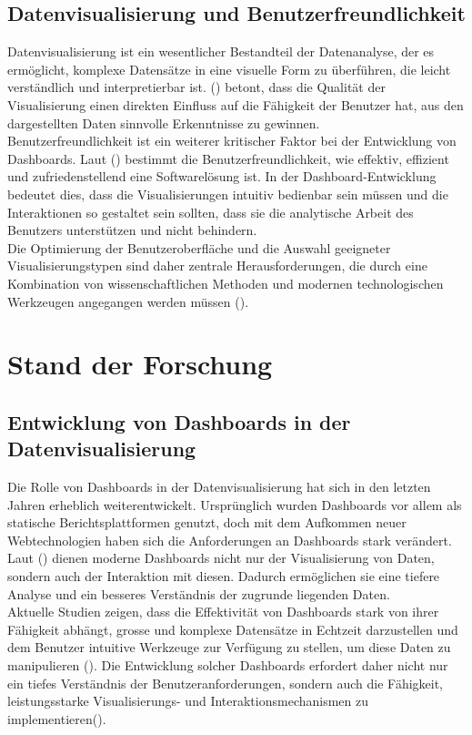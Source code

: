 \documentclass[a4paper, 12pt]{scrartcl}
\begin{document}
\subsection{Datenvisualisierung und Benutzerfreundlichkeit}
Datenvisualisierung ist ein wesentlicher Bestandteil der Datenanalyse, der es ermöglicht, komplexe Datensätze in eine visuelle Form zu überführen, die leicht verständlich und interpretierbar ist. (\cite{Nair2018}) betont, dass die Qualität der Visualisierung einen direkten Einfluss auf die Fähigkeit der Benutzer hat, aus den dargestellten Daten sinnvolle Erkenntnisse zu gewinnen.\\[1em]Benutzerfreundlichkeit ist ein weiterer kritischer Faktor bei der Entwicklung von Dashboards. Laut (\cite{Desai2016}) bestimmt die Benutzerfreundlichkeit, wie effektiv, effizient und zufriedenstellend eine Softwarelösung ist. In der Dashboard-Entwicklung bedeutet dies, dass die Visualisierungen intuitiv bedienbar sein müssen und die Interaktionen so gestaltet sein sollten, dass sie die analytische Arbeit des Benutzers unterstützen und nicht behindern.\\[1em]Die Optimierung der Benutzeroberfläche und die Auswahl geeigneter Visualisierungstypen sind daher zentrale Herausforderungen, die durch eine Kombination von wissenschaftlichen Methoden und modernen technologischen Werkzeugen angegangen werden müssen (\cite{Saket2019}).
\newpage
	\section{Stand der Forschung}
	\label{sec:standDerForschung}

\subsection{Entwicklung von Dashboards in der Datenvisualisierung}
Die Rolle von Dashboards in der Datenvisualisierung hat sich in den letzten Jahren erheblich weiterentwickelt. Ursprünglich wurden Dashboards vor allem als statische Berichtsplattformen genutzt, doch mit dem Aufkommen neuer Webtechnologien haben sich die Anforderungen an Dashboards stark verändert. Laut (\cite{Nunes2020}) dienen moderne Dashboards nicht nur der Visualisierung von Daten, sondern auch der Interaktion mit diesen. Dadurch ermöglichen sie eine tiefere Analyse und ein besseres Verständnis der zugrunde liegenden Daten.\\[1em] Aktuelle Studien zeigen, dass die Effektivität von Dashboards stark von ihrer Fähigkeit abhängt, grosse und komplexe Datensätze in Echtzeit darzustellen und dem Benutzer intuitive Werkzeuge zur Verfügung zu stellen, um diese Daten zu manipulieren (\cite{Stehle2019}). Die Entwicklung solcher Dashboards erfordert daher nicht nur ein tiefes Verständnis der Benutzeranforderungen, sondern auch die Fähigkeit, leistungsstarke Visualisierungs- und Interaktionsmechanismen zu implementieren(\cite{Setlur2023}).
\end{document}
